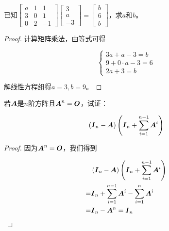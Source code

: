 \begin{problem}\label{problem-1.7}
已知\(\begin{bmatrix}a&1&1\\3&0&1\\0&2&-1\end{bmatrix}\begin{bmatrix}3\\a\\-3\end{bmatrix}=\begin{bmatrix}b\\6\\b\end{bmatrix}\)，求\(a\)和\(b\)。
\end{problem}
\begin{proof}
    计算矩阵乘法，由等式可得

    \begin{equation*}
        \begin{cases}
            3a+a-3=b       \\
            9+0\cdot a-3=6 \\
            2a+3=b
        \end{cases}
    \end{equation*}

    解线性方程组得\(a=3,b=9\)。
\end{proof}

\begin{problem}\label{problem-1.8}
若\(\boldsymbol{A}\)是\(n\)阶方阵且\(\boldsymbol{A}^n=\boldsymbol{O}\)，试证：

\begin{equation*}
    \left( \boldsymbol{I}_n-\boldsymbol{A} \right)\left( \boldsymbol{I}_n+\sum_{i=1}^{n-1}\boldsymbol{A}^i \right)
\end{equation*}
\end{problem}
\begin{proof}
    因为\(\boldsymbol{A}^n=\boldsymbol{O}\)，我们得到

    \begin{align*}
          & \left( \boldsymbol{I}_n-\boldsymbol{A} \right)\left( \boldsymbol{I}_n+\sum_{i=1}^{n-1}\boldsymbol{A}^i \right) \\
        = & \boldsymbol{I}_n+\sum_{i=1}^{n-1}\boldsymbol{A}^i-\sum_{i=1}^n\boldsymbol{A}^i          \\
        = & \boldsymbol{I}_n-\boldsymbol{A}^n=\boldsymbol{I}_n
    \end{align*}
\end{proof}

